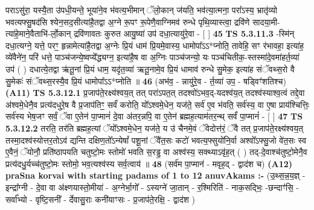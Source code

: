 \documentclass[17pt]{extarticle}
\begin{document}
                  पराऽसु॑रा॒ यस्यै॒ता उ॑पधी॒यन्ते॒ भूया॑ने॒व भ॑वत्य॒भीमान् ॅलो॒कान् ज॑यति॒ भव॑त्या॒त्मना॒ परा᳚ऽस्य॒ भ्रातृ॑व्यो भवत्यफ्सु॒षद॑सि श्येन॒सद॒सीत्या॑है॒तद्वा अ॒ग्ने रू॒पꣳ रू॒पेणै॒वाग्निमव॑ रुन्धे पृथि॒व्यास्त्वा॒ द्रवि॑णे सादया॒मी-त्या॑हे॒माने॒वैताभि॑-र्लो॒कान् द्रवि॑णावतः कुरुत आयु॒ष्या॑ उप॑ दधा॒त्यायु॑रे॒वा - [  ] \textbf{  45} \newline
                  \newline
                                \textbf{ TS 5.3.11.3} \newline
                  -स्मि॑न् दधा॒त्यग्ने॒ यत्ते॒ परꣳ॒॒ हृन्नामेत्या॑है॒तद्वा अ॒ग्नेः प्रि॒यं धाम॑ प्रि॒यमे॒वास्य॒ धामोपा᳚ऽऽ*प्नोति॒ तावेहि॒ सꣳ र॑भावहा॒ इत्या॑ह॒ व्ये॑वैने॑न॒ परि॑ धत्ते॒ पाञ्च॑जन्ये॒ष्वप्ये᳚द्ध्यग्न॒ इत्या॑है॒ष वा अ॒ग्निः पाञ्च॑जन्यो॒ यः पञ्च॑चितीक॒-स्तस्मा॑दे॒वमा॑हर्त॒व्या॑ उप॑ ( ) दधात्ये॒तद्वा ऋ॑तू॒नां प्रि॒यं धाम॒ यदृ॑त॒व्या॑ ऋतू॒नामे॒व प्रि॒यं धामाव॑ रुन्धे सु॒मेक॒ इत्या॑ह संॅवथ्स॒रो वै सु॒मेकः॑ संॅवथ्स॒रस्यै॒व प्रि॒यं धामोपा᳚ऽऽ*प्नोति ॥ \textbf{  46} \newline
                  \newline
                      (अभ॑व॒ - न्नायु॑रे॒॒व - र्त॒व्या॑ उप॒ - षड्विꣳ॑शतिश्च)  \textbf{(A11)} \newline \newline
                                        \textbf{ TS 5.3.12.1} \newline
                  प्र॒जाप॑ते॒रक्ष्य॑श्वय॒त् तत् परा॑ऽपत॒त् तदश्वो॑ऽभव॒द्-यदश्व॑य॒त् तदश्व॑स्याश्व॒त्वं तद्दे॒वा अ॑श्वमे॒धेनै॒व प्रत्य॑दधुरे॒ष वै प्र॒जाप॑तिꣳ॒॒ सर्वं॑ करोति॒ यो᳚ऽश्वमे॒धेन॒ यज॑ते॒ सर्व॑ ए॒व भ॑वति॒ सर्व॑स्य॒ वा ए॒षा प्राय॑श्चित्तिः॒ सर्व॑स्य भेष॒जꣳ सर्वं॒ ॅवा ए॒तेन॑ पा॒प्मानं॑ दे॒वा अ॑तर॒न्नपि॒ वा ए॒तेन॑ ब्रह्मह॒त्याम॑तर॒न्थ् सर्वं॑ पा॒प्मानं॑ - [  ] \textbf{  47} \newline
                  \newline
                                \textbf{ TS 5.3.12.2} \newline
                  तरति॒ तर॑ति ब्रह्मह॒त्यां ॅयो᳚ऽश्वमे॒धेन॒ यज॑ते॒ य उ॑ चैनमे॒वं ॅवेदोत्त॑रं॒ ॅवै तत् प्र॒जाप॑ते॒रक्ष्य॑श्वय॒त् तस्मा॒दश्व॑स्योत्तर॒तोऽव॑ द्यन्ति दक्षिण॒तो᳚ऽन्येषां᳚ पशू॒नां ॅवै॑त॒सः कटो॑ भवत्य॒फ्सुयो॑नि॒र्वा अश्वो᳚ऽफ्सु॒जो वे॑त॒सः स्व ए॒वैनं॒ ॅयोनौ॒ प्रति॑ष्ठापयति चतुष्टो॒मः स्तोमो॑ भवति स॒रड्ढ॒ वा अश्व॑स्य॒ सक्थ्याऽवृ॑ह॒त् ( ) तद्-दे॒वाश्च॑तुष्टो॒मेनै॒व प्रत्य॑दधु॒र्यच्च॑तुष्टो॒मः स्तोमो॒ भव॒त्यश्व॑स्य सर्व॒त्वाय॑ ॥ \textbf{  48 } \newline
                  \newline
                      (सर्व॑म पा॒प्मान॑ - मवृह॒द् - द्वाद॑श च)  \textbf{(A12)} \newline \newline
                \textbf{praSna korvai with starting padams of 1 to 12 anuvAkams :-} \newline
        (उ॒थ्स॒न्न॒य॒ज्ञ् - इन्द्रा᳚ग्नी - दे॒वा वा अ॑क्ष्णयास्तो॒मीया॑ - अ॒ग्नेर्भा॒गो᳚ - ऽस्यग्ने॑ जा॒तान् - र॒श्मिरिति॑ - नाक॒सद्भिः॒ -छन्दाꣳ॑सि॒ - सर्वा᳚भ्यो - वृष्टि॒सनी᳚ - र्देवासु॒राः कनी॑याꣳसः - प्र॒जाप॑ते॒रक्षि॒ - द्वाद॑श ) \newline
\end{document}
